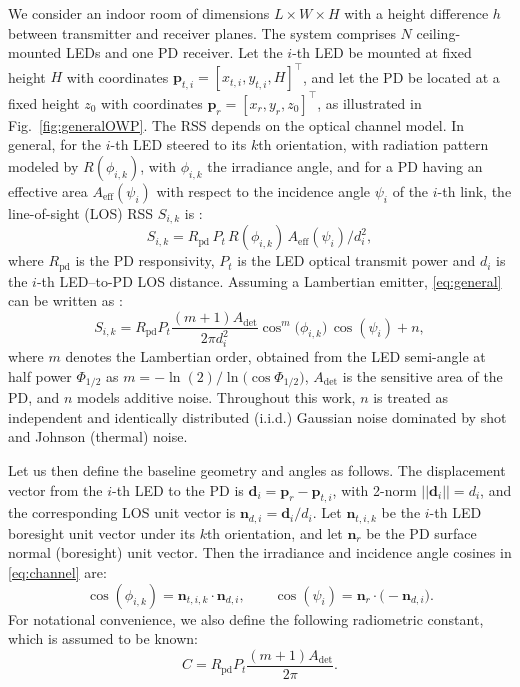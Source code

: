 \documentclass[conference]{IEEEtran}
\begin{document}
We consider an indoor room of dimensions $L \times W \times H$ with a height difference $h$ between transmitter and receiver planes. The system comprises $N$ ceiling-mounted LEDs and one PD receiver. Let the $i$-th LED be mounted at fixed height $H$ with coordinates $\mathbf{p}_{t,i} = [x_{t,i}, y_{t,i}, H]^\top$, and let the PD be located at a fixed height $z_0$ with coordinates $\mathbf{p}_{r} = [x_{r}, y_{r}, z_0]^\top$, as illustrated in Fig.~\ref{fig:generalOWP}. The RSS depends on the optical channel model. In general, for the $i$-th LED steered to its $k$th orientation, with radiation pattern modeled by $R(\phi_{i,k})$, with $\phi_{i,k}$ the irradiance angle, and for a PD having an effective area $A_{\mathrm{eff}}(\psi_i)$ with respect to the incidence angle $\psi_i$ of the $i$-th link, the line-of-sight (LOS) RSS $S_{i,k}$ is \cite{Kahn1997}:
\begin{equation}
    S_{i,k} = R_{\mathrm{pd}}\, P_t\, R(\phi_{i,k})\, A_{\mathrm{eff}}(\psi_i)/d_i^{2},
    \label{eq:general}
\end{equation}
where $R_{\mathrm{pd}}$ is the PD responsivity, $P_t$ is the LED optical transmit power and $d_i$ is the $i$-th LED–to-PD LOS distance. Assuming a Lambertian emitter, \eqref{eq:general} can be written as \cite{Kahn1997}:
\begin{equation}
    S_{i,k} = R_{\mathrm{pd}} P_t \frac{(m+1) A_{\mathrm{det}}}{2\pi d_i^{2}} \cos^{m}\!\bigl(\phi_{i,k}\bigr)\, \cos(\psi_i) + n,
    \label{eq:channel}
\end{equation}
where $m$ denotes the Lambertian order, obtained from the LED semi-angle at half power $\Phi_{1/2}$ as
$m = -\ln(2)/\ln\!\bigl(\cos \Phi_{1/2}\bigr)$, $A_{\mathrm{det}}$ is the sensitive area of the PD, and $n$ models additive noise. Throughout this work, $n$ is treated as independent and identically distributed (i.i.d.) Gaussian noise dominated by shot and Johnson (thermal) noise.

Let us then define the baseline geometry and angles as follows. The displacement vector from the $i$-th LED to the PD is $\mathbf{d}_i = \mathbf{p}_r - \mathbf{p}_{t,i}$, with 2-norm $||\mathbf{d}_i|| = d_i$, and the corresponding LOS unit vector is $\mathbf{n}_{d,i} = \mathbf{d}_i/d_i$. Let $\mathbf{n}_{t,i,k}$ be the $i$-th LED boresight unit vector under its $k$th orientation, and let $\mathbf{n}_r$ be the PD surface normal (boresight) unit vector. Then the irradiance and incidence angle cosines in \eqref{eq:channel} are:
\begin{equation}
    \cos(\phi_{i,k}) = \mathbf{n}_{t,i,k} \cdot \mathbf{n}_{d,i}, 
    \qquad
    \cos(\psi_i) = \mathbf{n}_{r} \cdot \bigl(-\mathbf{n}_{d,i}\bigr).
    \label{eq:cosine}
\end{equation}
For notational convenience, we also define the following radiometric constant, which is assumed to be known:
\begin{equation}
    C = R_{\mathrm{pd}} P_t \frac{(m+1) A_{\mathrm{det}}}{2\pi}.
    \label{eq:constant}
\end{equation}
\end{document}
